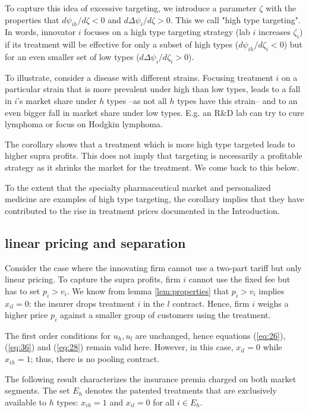 \documentclass[12pt,english,a4paper]{article}
\begin{document}
To capture this idea of excessive targeting, we introduce a parameter \(\zeta\) with the properties that \(d\psi_{ih}/d\zeta <0\) and \(d\Delta \psi_i/d\zeta>0\). This we call "high type targeting". In words, innovator \(i\) focuses on a high type targeting strategy (lab \(i\) increases \(\zeta_i\)) if its treatment will be effective for only a subset of high types (\(d\psi_{ih}/d\zeta_i <0\)) but for an even smaller set of low types (\(d\Delta\psi_i/d\zeta_i>0\)).

To illustrate, consider a disease with different strains. Focusing treatment \(i\) on a particular strain that is more prevalent under high than low types, leads to a fall in \(i\)'s market share under \(h\) types --as not all \(h\) types have this strain-- and to an even bigger fall in market share under low types. E.g. an R\&D lab can try to cure lymphoma or focus on Hodgkin lymphoma.

The corollary shows that a treatment which is more high type targeted leads to higher supra profits. This does not imply that targeting is necessarily a profitable strategy as it shrinks the market for the treatment. We come back to this below.

To the extent that the specialty pharmaceutical market and  personalized medicine are examples of high type targeting, the corollary implies that they have contributed to the rise in treatment prices documented in the Introduction.

\subsection{linear pricing and separation}
\label{sec:org547d82a}

Consider the case where the innovating firm cannot use a two-part tariff but only linear pricing. To capture the supra profits, firm \(i\) cannot use the fixed fee but has to set \(p_i > v_i\). We know from lemma \ref{lem:properties} that \(p_i>v_i\) implies \(x_{il}=0\): the insurer drops treatment \(i\) in the \(l\) contract. Hence, firm \(i\) weighs a higher price \(p_i\) against a smaller group of customers using the treatment.

The first order conditions for \(u_h,u_l\) are unchanged, hence equations (\ref{eq:26}), (\ref{eq:36}) and (\ref{eq:28}) remain valid here. However, in this case, \(x_{il}=0\) while \(x_{ih}=1\); thus, there is no pooling contract.

The following result characterizes the insurance premia charged on both market segments. The set \(E_h\) denotes the patented treatments that are exclusively available to \(h\) types: \(x_{ih}=1\) and \(x_{il}=0\) for all \(i \in E_h\).
\end{document}
